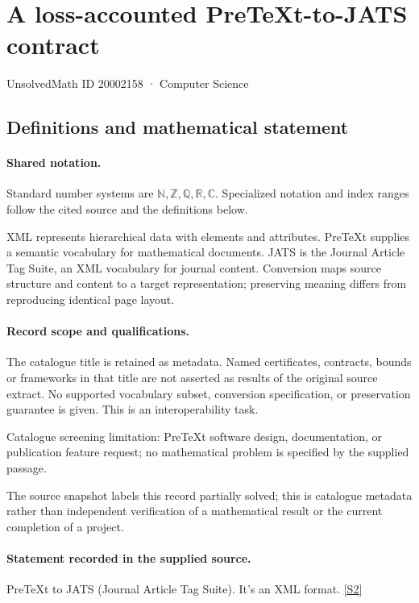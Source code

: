 \documentclass[11pt]{article}
\newcommand{\sref}[2]{\hyperlink{source:#1:#2}{[S#2]}}
\begin{document}
\setcounter{section}{20002157}
\section{A loss-accounted PreTeXt-to-JATS contract}\label{20002158}
{\small\sffamily UnsolvedMath ID 20002158 · Computer Science}
\subsection{Definitions and mathematical statement}

\paragraph{Shared notation.}Standard number systems are $\mathbb N,\mathbb Z,\mathbb Q,\mathbb R,\mathbb C$. Specialized notation and index ranges follow the cited source and the definitions below.


XML represents hierarchical data with elements and attributes. PreTeXt supplies a semantic vocabulary for mathematical documents. JATS is the Journal Article Tag Suite, an XML vocabulary for journal content. Conversion maps source structure and content to a target representation; preserving meaning differs from reproducing identical page layout.
\paragraph{Record scope and qualifications.}
The catalogue title is retained as metadata. Named certificates, contracts, bounds or frameworks in that title are not asserted as results of the original source extract.
No supported vocabulary subset, conversion specification, or preservation guarantee is given. This is an interoperability task.

Catalogue screening limitation: PreTeXt software design, documentation, or publication feature request; no mathematical problem is specified by the supplied passage.

The source snapshot labels this record partially solved; this is catalogue metadata rather than independent verification of a mathematical result or the current completion of a project.
\paragraph{Statement recorded in the supplied source.}
PreTeXt to JATS (Journal Article Tag Suite). It's an XML format. \sref{20002158}{2}
\end{document}
